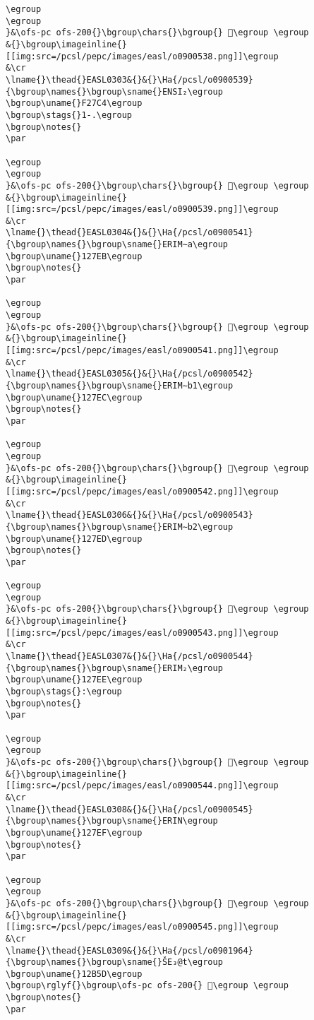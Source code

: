 \begin{verbatim}
\egroup
\egroup
}&\ofs-pc ofs-200{}\bgroup\chars{}\bgroup{} 󲟃\egroup \egroup
&{}\bgroup\imageinline{}[[img:src=/pcsl/pepc/images/easl/o0900538.png]]\egroup
&\cr
\lname{}\thead{}EASL0303&{}&{}\Ha{/pcsl/o0900539}{\bgroup\names{}\bgroup\sname{}ENSI₂\egroup
\bgroup\uname{}F27C4\egroup
\bgroup\stags{}1-.\egroup
\bgroup\notes{}
\par 

\egroup
\egroup
}&\ofs-pc ofs-200{}\bgroup\chars{}\bgroup{} 󲟄\egroup \egroup
&{}\bgroup\imageinline{}[[img:src=/pcsl/pepc/images/easl/o0900539.png]]\egroup
&\cr
\lname{}\thead{}EASL0304&{}&{}\Ha{/pcsl/o0900541}{\bgroup\names{}\bgroup\sname{}ERIM∼a\egroup
\bgroup\uname{}127EB\egroup
\bgroup\notes{}
\par 

\egroup
\egroup
}&\ofs-pc ofs-200{}\bgroup\chars{}\bgroup{} 𒟫\egroup \egroup
&{}\bgroup\imageinline{}[[img:src=/pcsl/pepc/images/easl/o0900541.png]]\egroup
&\cr
\lname{}\thead{}EASL0305&{}&{}\Ha{/pcsl/o0900542}{\bgroup\names{}\bgroup\sname{}ERIM∼b1\egroup
\bgroup\uname{}127EC\egroup
\bgroup\notes{}
\par 

\egroup
\egroup
}&\ofs-pc ofs-200{}\bgroup\chars{}\bgroup{} 𒟬\egroup \egroup
&{}\bgroup\imageinline{}[[img:src=/pcsl/pepc/images/easl/o0900542.png]]\egroup
&\cr
\lname{}\thead{}EASL0306&{}&{}\Ha{/pcsl/o0900543}{\bgroup\names{}\bgroup\sname{}ERIM∼b2\egroup
\bgroup\uname{}127ED\egroup
\bgroup\notes{}
\par 

\egroup
\egroup
}&\ofs-pc ofs-200{}\bgroup\chars{}\bgroup{} 𒟭\egroup \egroup
&{}\bgroup\imageinline{}[[img:src=/pcsl/pepc/images/easl/o0900543.png]]\egroup
&\cr
\lname{}\thead{}EASL0307&{}&{}\Ha{/pcsl/o0900544}{\bgroup\names{}\bgroup\sname{}ERIM₂\egroup
\bgroup\uname{}127EE\egroup
\bgroup\stags{}:\egroup
\bgroup\notes{}
\par 

\egroup
\egroup
}&\ofs-pc ofs-200{}\bgroup\chars{}\bgroup{} 𒟮\egroup \egroup
&{}\bgroup\imageinline{}[[img:src=/pcsl/pepc/images/easl/o0900544.png]]\egroup
&\cr
\lname{}\thead{}EASL0308&{}&{}\Ha{/pcsl/o0900545}{\bgroup\names{}\bgroup\sname{}ERIN\egroup
\bgroup\uname{}127EF\egroup
\bgroup\notes{}
\par 

\egroup
\egroup
}&\ofs-pc ofs-200{}\bgroup\chars{}\bgroup{} 𒟯\egroup \egroup
&{}\bgroup\imageinline{}[[img:src=/pcsl/pepc/images/easl/o0900545.png]]\egroup
&\cr
\lname{}\thead{}EASL0309&{}&{}\Ha{/pcsl/o0901964}{\bgroup\names{}\bgroup\sname{}ŠE₃@t\egroup
\bgroup\uname{}12B5D\egroup
\bgroup\rglyf{}\bgroup\ofs-pc ofs-200{} 𒭝\egroup \egroup
\bgroup\notes{}
\par 


\end{verbatim}
